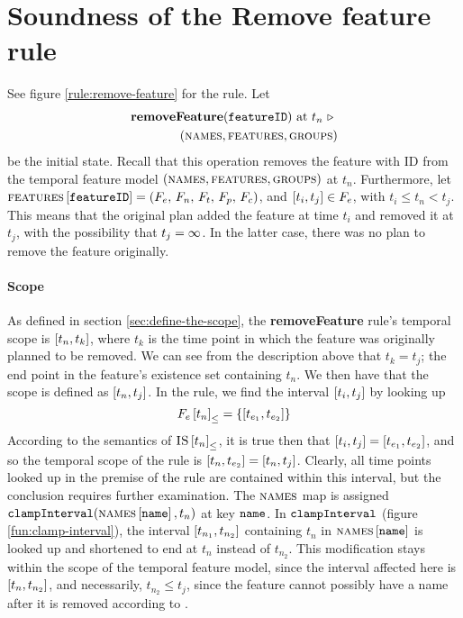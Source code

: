 \section{Soundness of the Remove feature rule}
\label{sec:soundness-of-the-remove-feature-rule}

See figure \vref{rule:remove-feature} for the  rule. 
Let 
\begin{equation*}
   \begin{split}
      \textbf{removeFeature}(\texttt{featureID})\text{ at } t_n
      \ \triangleright \  \\
   (\textsc{names}{}, \textsc{features}{}, \textsc{groups}{}{})
\end{split}
\end{equation*}
be the initial state. Recall that this operation removes the feature with ID  from the temporal feature model $(\textsc{names}{}, \textsc{features}{}, \textsc{groups}{}{})$ at $t_n$. Furthermore, let $\textsc{features} \left[ \texttt{featureID} \right] = \left(F_e,\, F_n,\, F_t,\, F_p,\, F_c\right)$, and $\interval{t_i}{t_j} \in F_e$, with $t_i \leq t_n < t_j$. This means that the original plan added the feature at time $t_i$ and removed it at $t_j$, with the possibility that $t_j = \infty$. In the latter case, there was no plan to remove the feature originally.

\paragraph{Scope}
As defined in section \vref{sec:define-the-scope}, the \textbf{removeFeature} rule's temporal scope is $\interval{t_n}{t_k}$, where $t_k$ is the time point in which the feature was originally planned to be removed. We can see from the description above that $t_k = t_j$; the end point in the feature's existence set containing $t_n$. We then have that the scope is defined as $\interval{t_n}{t_j}$. In the rule, we find the interval $\interval{t_i}{t_j}$ by looking up
\begin{equation*}
   \containing{F_e}{t_n} = \set{\interval{t_{e_1}}{t_{e_2}}}
\end{equation*}
   According to the semantics of ${\textsc{IS} \left[ t_n \right]}_{\leq}$, it is true then that $\interval{t_i}{t_j} = \interval{t_{e_1}}{t_{e_2}}$, and so the temporal scope of the rule is $\interval{t_n}{t_{e_2}} = \interval{t_n}{t_j}$. Clearly, all time points looked up in the premise of the rule are contained within this interval, but the conclusion requires further examination. The $\textsc{names}{}$ map is assigned $\texttt{clampInterval}(\textsc{names} \left[ \texttt{name} \right], t_n)$ at key $\texttt{name}$. In $\texttt{clampInterval}$ (figure \vref{fun:clamp-interval}), the interval $\interval{t_{n_1}}{t_{n_2}}$ containing $t_n$ in $\textsc{names} \left[ \texttt{name} \right]$ is looked up and shortened to end at $t_n$ instead of $t_{n_2}$. This modification stays within the scope of the temporal feature model, since the interval affected here is $\interval{t_n}{t_{n_2}}$, and necessarily, $t_{n_2} \leq t_j$, since the feature cannot possibly have a name after it is removed according to . 

